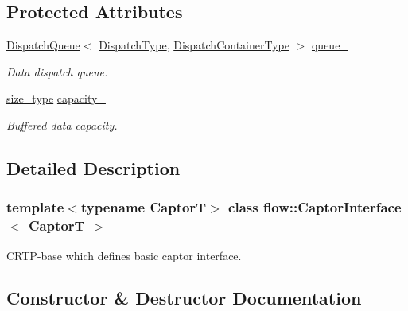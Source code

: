 \subsection*{Protected Attributes}
\begin{DoxyCompactItemize}
\item 
\mbox{\label{classflow_1_1_captor_interface_a79b57c2c5af6220ec0342d75a654661c}} 
\hyperlink{classflow_1_1_dispatch_queue}{Dispatch\+Queue}$<$ \hyperlink{classflow_1_1_captor_interface_ae1eafeb6cd50f4a50843b963c232720a}{Dispatch\+Type}, \hyperlink{classflow_1_1_captor_interface_a887171bf3b12d8232922a81844ea9a7d}{Dispatch\+Container\+Type} $>$ \hyperlink{classflow_1_1_captor_interface_a79b57c2c5af6220ec0342d75a654661c}{queue\+\_\+}
\begin{DoxyCompactList}\small\item\em Data dispatch queue. \end{DoxyCompactList}\item 
\mbox{\label{classflow_1_1_captor_interface_a3675a127538e71404b53f7b1c36923d4}} 
\hyperlink{classflow_1_1_captor_interface_a62db6a158eebcb377e63ede6a1f1a8c6}{size\+\_\+type} \hyperlink{classflow_1_1_captor_interface_a3675a127538e71404b53f7b1c36923d4}{capacity\+\_\+}
\begin{DoxyCompactList}\small\item\em Buffered data capacity. \end{DoxyCompactList}\end{DoxyCompactItemize}


\subsection{Detailed Description}
\subsubsection*{template$<$typename CaptorT$>$\newline
class flow\+::\+Captor\+Interface$<$ Captor\+T $>$}

C\+R\+T\+P-\/base which defines basic captor interface. 

\subsection{Constructor \& Destructor Documentation}
\mbox{\label{classflow_1_1_captor_interface_a338790affab83521d1afdfa57df616dd}} 

